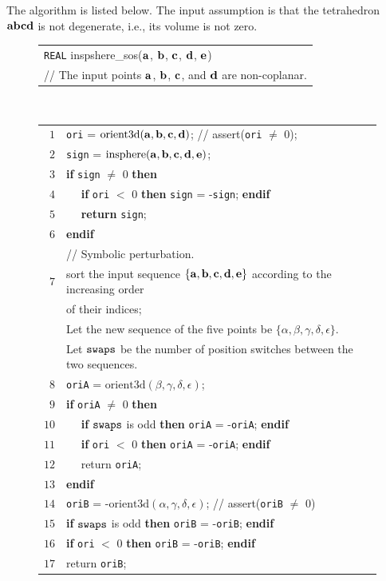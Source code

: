 The algorithm is listed below. The input assumption is that the tetrahedron ${\bf abcd}$ is not degenerate, i.e., its volume is not zero.

\begin{figure}[h]
\begin{tabular}{l}
{\tt REAL} {\sc inspshere\_sos}(${\bf a}$, ${\bf b}$, ${\bf c}$, ${\bf d}$, ${\bf e}$)\\
// The input points ${\bf a}$, ${\bf b}$, ${\bf c}$, and ${\bf d}$ are non-coplanar.
\end{tabular}\\
\begin{tabular}{rl}
$1$ & {\tt ori} = $\textrm{orient3d}({\bf a}, {\bf b}, {\bf c}, {\bf d})$; // assert({\tt ori} $\neq$ 0);\\ 
$2$ & {\tt sign} = $\textrm{insphere}({\bf a}, {\bf b}, {\bf c}, {\bf d}, {\bf e})$;\\
$3$ & {\bf if} {\tt sign} $\neq$ 0 {\bf then}\\
$4$ & $\quad$ {\bf if} {\tt ori} $<$ 0 {\bf then} {\tt sign} = -{\tt sign}; {\bf endif}\\
$5$ & $\quad$ {\bf return} {\tt sign};\\
$6$ & {\bf endif}\\
 & // Symbolic perturbation.\\
$7$ & sort the input sequence $\{ {\bf a}, {\bf b}, {\bf c}, {\bf d}, {\bf e}\}$ according to  the increasing order\\
 & of their indices;\\
 & Let the new sequence of the five points be $\{\alpha, \beta, \gamma, \delta, \epsilon\}$.\\
 & Let ${\tt swaps}$ be the number of position switches between the two sequences.\\
$8$ & {\tt oriA} = $\textrm{orient3d}(\beta, \gamma, \delta, \epsilon)$;\\
$9$ & {\bf if} {\tt oriA} $\neq$ 0 {\bf then}\\
$10$ & $\quad$ {\bf if} ${\tt swaps}$ is odd {\bf then} {\tt oriA} = -{\tt oriA}; {\bf endif}\\
$11$ & $\quad$ {\bf if} {\tt ori} $<$ 0 {\bf then} {\tt oriA} = -{\tt oriA}; {\bf endif}\\
$12$ & $\quad$ return {\tt oriA};\\
$13$ & {\bf endif}\\
$14$ & {\tt oriB} = -$\textrm{orient3d}(\alpha, \gamma, \delta, \epsilon)$; // assert({\tt oriB} $\neq$ 0)\\
$15$ & {\bf if} ${\tt swaps}$ is odd {\bf then} {\tt oriB} = -{\tt oriB}; {\bf endif}\\
$16$ & {\bf if} {\tt ori} $<$ 0 {\bf then} {\tt oriB} = -{\tt oriB}; {\bf endif}\\
$17$ & return {\tt oriB};\\
\end{tabular}
\end{figure}

